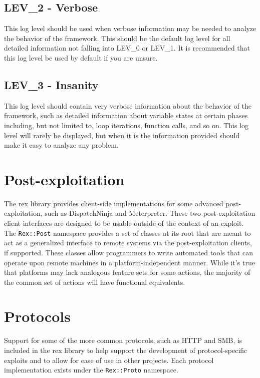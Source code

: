 \documentclass{report}
\begin{document}
        \subsection{LEV\_2 - Verbose}

This log level should be used when verbose information may be needed
to analyze the behavior of the framework.  This should be the
default log level for all detailed information not falling into
LEV\_0 or LEV\_1. It is recommended that this log level be used by
default if you are unsure.

        \subsection{LEV\_3 - Insanity}

This log level should contain very verbose information about the
behavior of the framework, such as detailed information about variable
states at certain phases including, but not limited to, loop iterations,
function calls, and so on.  This log level will rarely be displayed,
but when it is the information provided should make it easy to analyze
any problem.

    \section{Post-exploitation}

\par
The rex library provides client-side implementations for some
advanced post-exploitation, such as DispatchNinja and Meterpreter.
These two post-exploitation client interfaces are designed to be
usable outside of the context of an exploit.  The \texttt{Rex::Post}
namespace provides a set of classes at its root that are meant to
act as a generalized interface to remote systems via the
post-exploitation clients, if supported.  These classes allow
programmers to write automated tools that can operate upon remote
machines in a platform-independent manner.  While it's true that
platforms may lack analogous feature sets for some actions, the
majority of the common set of actions will have functional
equivalents.

    \section{Protocols}

\par
Support for some of the more common protocols, such as HTTP and SMB,
is included in the rex library to help support the development of
protocol-specific exploits and to allow for ease of use in other
projects.  Each protocol implementation exists under the
\texttt{Rex::Proto} namespace.
\end{document}
